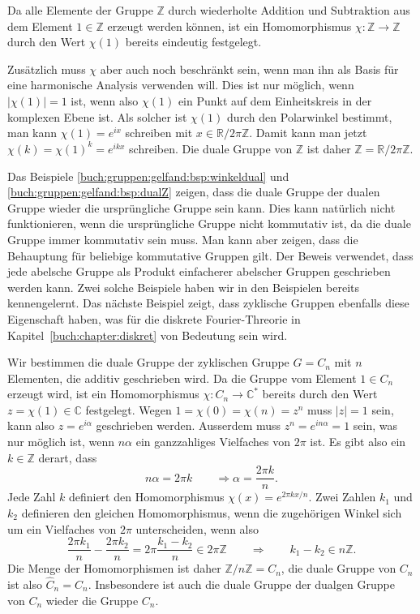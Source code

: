 \begin{beispiel}
\label{buch:gruppen:gelfand:bsp:dualZ}
Da alle Elemente der Gruppe $\mathbb{Z}$ durch wiederholte Addition 
und Subtraktion aus dem Element $1\in\mathbb{Z}$ erzeugt werden können,
ist ein Homomorphismus $\chi\colon \mathbb{Z}\to\mathbb{Z}$ durch
den Wert $\chi(1)$ bereits eindeutig festgelegt.

Zusätzlich muss $\chi$ aber auch noch beschränkt sein, wenn man ihn
als Basis für eine harmonische Analysis verwenden will.
Dies ist nur möglich, wenn $|\chi(1)|=1$ ist, wenn also $\chi(1)$
ein Punkt auf dem Einheitskreis in der komplexen Ebene ist.
Als solcher ist $\chi(1)$ durch den Polarwinkel bestimmt, man kann
$\chi(1)=e^{ix}$ schreiben mit $x\in\mathbb{R}/2\pi\mathbb{Z}$.
Damit kann man jetzt $\chi(k)=\chi(1)^k = e^{ikx}$ schreiben.
Die duale Gruppe von $\mathbb{Z}$ ist daher
$\hat{\mathbb{Z}} = \mathbb{R}/2\pi \mathbb{Z}$.
\end{beispiel}

Das Beispiele
\ref{buch:gruppen:gelfand:bsp:winkeldual}
und
\ref{buch:gruppen:gelfand:bsp:dualZ}
zeigen, dass die duale Gruppe der dualen Gruppe wieder die ursprüngliche
Gruppe sein kann.
Dies kann natürlich nicht funktionieren, wenn die ursprüngliche Gruppe
nicht kommutativ ist, da die duale Gruppe immer kommutativ sein muss.
Man kann aber zeigen, dass die Behauptung für beliebige kommutative
Gruppen gilt.
Der Beweis verwendet, dass jede abelsche Gruppe als Produkt einfacherer
abelscher Gruppen geschrieben werden kann.
Zwei solche Beispiele haben wir in den Beispielen bereits kennengelernt.
Das nächste Beispiel zeigt, dass zyklische Gruppen ebenfalls diese Eigenschaft
haben, was für die diskrete Fourier-Threorie in
Kapitel~\ref{buch:chapter:diskret} von Bedeutung sein wird.

\begin{beispiel}
Wir bestimmen die duale Gruppe der zyklischen Gruppe $G=C_n$ mit $n$
Elementen, die additiv geschrieben wird.
Da die Gruppe vom Element $1\in C_n$ erzeugt wird, ist
ein Homomorphismus $\chi\colon C_n\to\mathbb{C}^*$ bereits durch den
Wert $z=\chi(1)\in\mathbb{C}$ festgelegt.
Wegen $1=\chi(0)=\chi(n)=z^n$ muss $|z|=1$ sein, kann also $z=e^{i\alpha}$
geschrieben werden.
Ausserdem muss $z^n=e^{in\alpha}=1$ sein, was nur möglich ist, wenn
$n\alpha$ ein ganzzahliges Vielfaches von $2\pi$ ist.
Es gibt also ein $k\in \mathbb{Z}$ derart, dass 
\[
n\alpha = 2\pi k
\qquad
\Rightarrow
\alpha = \frac{2\pi k}{n}.
\]
Jede Zahl $k$ definiert den Homomorphismus $\chi(x) = e^{2\pi kx/n}$.
Zwei Zahlen $k_1$ und $k_2$ definieren den gleichen Homomorphismus,
wenn die zugehörigen Winkel sich um ein Vielfaches von $2\pi$ unterscheiden,
wenn also
\[
\frac{2\pi k_1}{n} - \frac{2\pi k_2}{n}
=
2\pi\frac{k_1-k_2}{n}
\in
2\pi \mathbb{Z}
\qquad\Rightarrow\qquad
k_1-k_2
\in
n\mathbb{Z}.
\]
Die Menge der Homomorphismen ist daher $\mathbb{Z}/n\mathbb{Z}=C_n$,
die duale Gruppe von $C_n$ ist also $\hat{C}_n=C_n$.
Insbesondere ist auch die duale Gruppe der dualgen Gruppe von $C_n$ 
wieder die Gruppe $C_n$.
\end{beispiel}



